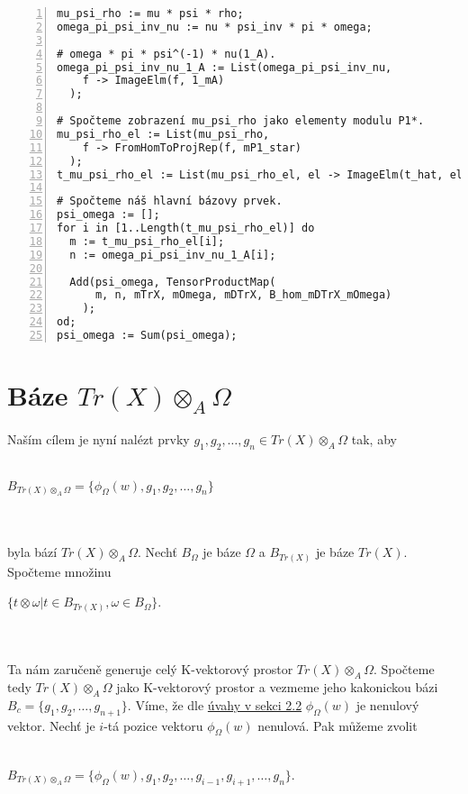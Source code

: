       \begin{Verbatim}[frame=single,numbers=left]
mu_psi_rho := mu * psi * rho;
omega_pi_psi_inv_nu := nu * psi_inv * pi * omega;

# omega * pi * psi^(-1) * nu(1_A).
omega_pi_psi_inv_nu_1_A := List(omega_pi_psi_inv_nu, 
    f -> ImageElm(f, 1_mA)
  );

# Spočteme zobrazení mu_psi_rho jako elementy modulu P1*.
mu_psi_rho_el := List(mu_psi_rho, 
    f -> FromHomToProjRep(f, mP1_star)
  );
t_mu_psi_rho_el := List(mu_psi_rho_el, el -> ImageElm(t_hat, el));

# Spočteme náš hlavní bázovy prvek.
psi_omega := [];
for i in [1..Length(t_mu_psi_rho_el)] do
  m := t_mu_psi_rho_el[i];
  n := omega_pi_psi_inv_nu_1_A[i];

  Add(psi_omega, TensorProductMap(
      m, n, mTrX, mOmega, mDTrX, B_hom_mDTrX_mOmega)
    );
od;
psi_omega := Sum(psi_omega);
      \end{Verbatim}
       
  \section{Báze $Tr(X)\otimes_A \Omega$}\label{alg-baze}
  
      \paragraph{ }Naším cílem je nyní nalézt prvky $g_1,g_2,\ldots,g_n\in Tr(X)\otimes_A\Omega$
      tak, aby\\\\
      \centerline{$B_{Tr(X)\otimes_A\Omega}=\{\phi_\Omega(w),g_1,g_2,\ldots,g_n\}$}\\\\ 
      byla bází $Tr(X)\otimes_A\Omega$. Nechť $B_{\Omega}$ je báze $\Omega$ 
      a $B_{Tr(X)}$ je báze $Tr(X)$. Spočteme množinu  \\
      \centerline{$\{t\otimes\omega|t\in B_{Tr(X)},\omega\in B_{\Omega}\}$.} \\\\
      Ta nám zaručeně generuje
      celý K-vektorový prostor  $Tr(X)\otimes_A\Omega$. Spočteme tedy $Tr(X)\otimes_A\Omega$ 
      jako K-vektorový prostor a vezmeme jeho kakonickou bázi 
      $B_c=\{g_1,g_2,\ldots,g_{n+1}\}$. Víme, že dle \hyperref[phi-omega-nenul]{úvahy v sekci 2.2}
      $\phi_\Omega(w)$ je nenulový vektor. Nechť je $i$-tá pozice vektoru $\phi_\Omega(w)$ 
      nenulová. Pak můžeme zvolit \\\\
      \centerline{
        $B_{Tr(X)\otimes_A\Omega}=\{\phi_\Omega(w),g_1,g_2,\ldots,g_{i-1},g_{i+1},\ldots,g_n\}$.
      }\\     

